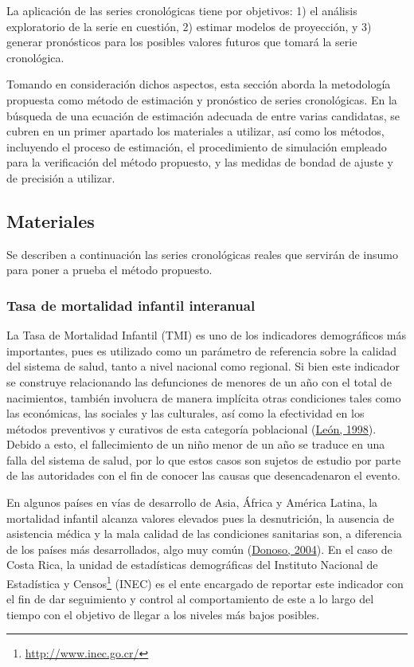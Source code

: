 \documentclass[
]{article}
\begin{document}
\label{chap:metodologia}

La aplicación de las series cronológicas tiene por objetivos: 1) el
análisis exploratorio de la serie en cuestión, 2) estimar modelos de
proyección, y 3) generar pronósticos para los posibles valores futuros
que tomará la serie cronológica.

Tomando en consideración dichos aspectos, esta sección aborda la
metodología propuesta como método de estimación y pronóstico de series
cronológicas. En la búsqueda de una ecuación de estimación adecuada de
entre varias candidatas, se cubren en un primer apartado los materiales
a utilizar, así como los métodos, incluyendo el proceso de estimación,
el procedimiento de simulación empleado para la verificación del método
propuesto, y las medidas de bondad de ajuste y de precisión a utilizar.

\subsection{Materiales}

Se describen a continuación las series cronológicas reales que servirán
de insumo para poner a prueba el método propuesto.

\subsubsection{Tasa de mortalidad infantil interanual}

La Tasa de Mortalidad Infantil (TMI) es uno de los indicadores
demográficos más importantes, pues es utilizado como un parámetro de
referencia sobre la calidad del sistema de salud, tanto a nivel nacional
como regional. Si bien este indicador se construye relacionando las
defunciones de menores de un año con el total de nacimientos, también
involucra de manera implícita otras condiciones tales como las
económicas, las sociales y las culturales, así como la efectividad en
los métodos preventivos y curativos de esta categoría poblacional
(\protect\hyperlink{ref-leon}{León, 1998}). Debido a esto, el
fallecimiento de un niño menor de un año se traduce en una falla del
sistema de salud, por lo que estos casos son sujetos de estudio por
parte de las autoridades con el fin de conocer las causas que
desencadenaron el evento.

En algunos países en vías de desarrollo de Asia, África y América
Latina, la mortalidad infantil alcanza valores elevados pues la
desnutrición, la ausencia de asistencia médica y la mala calidad de las
condiciones sanitarias son, a diferencia de los países más
desarrollados, algo muy común (\protect\hyperlink{ref-donoso}{Donoso,
2004}). En el caso de Costa Rica, la unidad de estadísticas demográficas
del Instituto Nacional de Estadística y Censos\footnote{\url{http://www.inec.go.cr/}}
(INEC) es el ente encargado de reportar este indicador con el fin de dar
seguimiento y control al comportamiento de este a lo largo del tiempo
con el objetivo de llegar a los niveles más bajos posibles.
\end{document}

